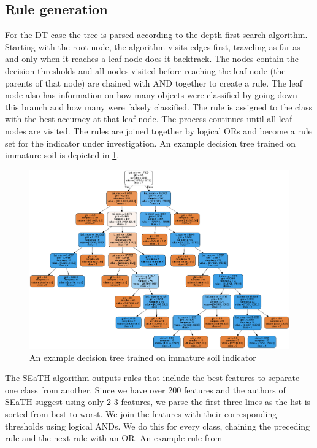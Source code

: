 \documentclass[authoryear, review,12pt,number]{elsarticle}
\begin{document}
\subsection{Rule generation}
For the DT case the tree is parsed according to the depth first search
algorithm. Starting with the root node, the algorithm visits edges first, 
traveling as far as and only when it reaches a leaf node does it backtrack. The 
nodes contain the decision thresholds and all nodes visited before reaching the 
leaf node (the parents of that node) are chained with AND together to create a 
rule. The leaf node also has information on how many objects were classified by 
going down this branch and how many were falsely classified. The rule is 
assigned to the class with the best accuracy at that leaf node. The process 
continues until all leaf nodes are visited. The rules are joined 
together by logical ORs and become a rule set for the indicator under 
investigation. An example decision tree trained on immature soil is depicted in 
\ref{fig:decisiontree}.
\begin{figure}
    \label{fig:decisiontree}
\includegraphics[width=\textwidth]{diagrams/natfo_immature_soil_dt.png}
    \caption{An example decision tree trained on immature soil indicator}
\end{figure}
The SEaTH algorithm outputs rules that include the best features to separate 
one class from another. Since we have over 200 features and the authors of 
SEaTH suggest using only 2-3 features, we parse the first three lines as the 
list is sorted from best to worst. We join the features with their 
corresponding thresholds using logical ANDs. We do this for every class, 
chaining the preceding rule and the next rule with an OR. An example rule from 
\end{document}
